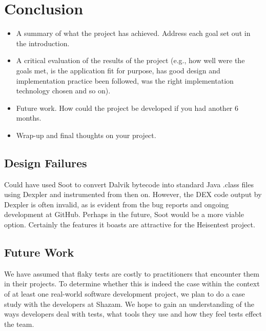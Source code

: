 \section{Conclusion}
\label{sec:conc}

\begin{mdframed}
	\begin{itemize}
		\item A summary of what the project has achieved. Address each goal set out in the introduction.
		\item A critical evaluation of the results of the project (e.g., how well were the goals met, is the application fit for purpose, has good design and implementation practice been followed, was the right implementation technology chosen and so on).
		\item Future work. How could the project be developed if you had another 6 months.
		\item Wrap-up and final thoughts on your project.
	\end{itemize}
\end{mdframed}


\subsection{Design Failures}

Could have used Soot to convert Dalvik bytecode into standard Java .class files using Dexpler \cite{bartel:soap2012} and instrumented from then on. However, the DEX code output by Dexpler is often invalid, as is evident from the bug reports and ongoing development at GitHub. Perhaps in the future, Soot would be a more viable option. Certainly the features it boasts are attractive for the Heisentest project.


\subsection{Future Work}

We have assumed that flaky tests are costly to practitioners that encounter them in their projects. To determine whether this is indeed the case within the context of at least one real-world software development project, we plan to do a case study with the developers at Shazam. We hope to gain an understanding of the ways developers deal with \flaky{} tests, what tools they use and how they feel \flaky{} tests effect the team.

